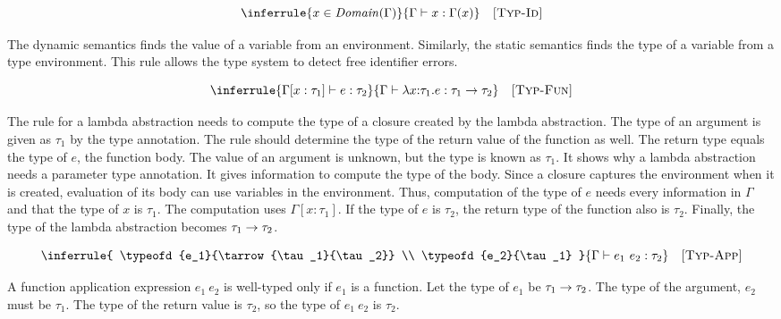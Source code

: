 \[
  \inferrule
  { x\in\dom{\Gamma} }
  { \typeofd{x}{\Gamma(x)} }
  \quad\textsc{[Typ-Id]}
\]

The dynamic semantics finds the value of a variable from an environment.
Similarly, the static semantics
finds the type of a variable from a type environment. This rule allows the
type system to detect free identifier errors.


\vspace{-1em}

\[
  \inferrule
  { \typeof{\Gamma[x:\tau_1]}{e}{\tau_2} }
  { \typeofd{\efunt{x}{\tau_1}{e}}{\tarrow{\tau_1}{\tau_2}} }
  \quad\textsc{[Typ-Fun]}
\]

The rule for a lambda abstraction needs to compute the type of a closure created
by the lambda abstraction. The type of an argument is given as $\tau_1$ by the
type annotation. The rule should determine the type of the return value of the function
as well. The return type equals the type of $e$, the function body. The value of an
argument is unknown, but the type is known as $\tau_1$. It shows why
a lambda abstraction needs a parameter type annotation. It gives information to
compute the type of the body. Since a closure captures
the environment when it is created, evaluation of its body can use variables in
the environment. Thus, computation of the type of $e$ needs every information in
$\Gamma$ and that the type of $x$ is $\tau_1$. The computation uses
$\Gamma[x:\tau_1]$. If the type of $e$ is $\tau_2$, the return type of
the function also is $\tau_2$. Finally, the type of the lambda abstraction becomes
$\tau_1\rightarrow\tau_2$.


\vspace{-1em}

\[
  \inferrule
  { \typeofd{e_1}{\tarrow{\tau_1}{\tau_2}} \\
    \typeofd{e_2}{\tau_1} }
  { \typeofd{e_1\ e_2}{\tau_2} }
  \quad\textsc{[Typ-App]}
\]

A function application expression $e_1\ e_2$ is well-typed only if $e_1$ is a function. Let
the type of $e_1$ be $\tau_1\rightarrow\tau_2$. The type of the argument, $e_2$
must be $\tau_1$. The type of the return value is $\tau_2$, so the type of
$e_1\ e_2$ is $\tau_2$.

